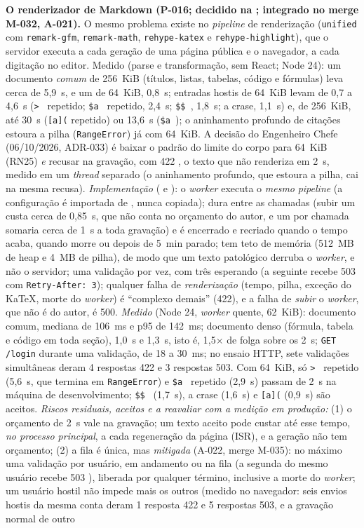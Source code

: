 \textbf{O renderizador de Markdown (P-016; decidido na ; integrado no merge M-032, A-021).} O mesmo problema existe no \emph{pipeline} de renderização (\texttt{unified} com \texttt{remark-gfm}, \texttt{remark-math}, \texttt{rehype-katex} e \texttt{rehype-highlight}), que o servidor executa a cada geração de uma página pública e o navegador, a cada digitação no editor. Medido (parse e transformação, sem React; Node 24): um documento \emph{comum} de 256~KiB (títulos, listas, tabelas, código e fórmulas) leva cerca de 5,9~s, e um de 64~KiB, 0,8~s; entradas hostis de 64~KiB levam de 0,7 a 4,6~s (\texttt{> } repetido; \texttt{\$a } repetido, 2,4~s; \texttt{\$\$ }, 1,8~s; a crase, 1,1~s) e, de 256~KiB, até 30~s (\texttt{[a](} repetido) ou 13,6~s (\texttt{\$a }); o aninhamento profundo de citações estoura a pilha (\texttt{RangeError}) já com 64~KiB. A decisão do Engenheiro Chefe (06/10/2026, ADR-033) é baixar o padrão do limite do corpo para 64~KiB (RN25) \emph{e} recusar na gravação, com 422 , o texto que não renderiza em 2~s, medido em um \emph{thread} separado (o aninhamento profundo, que estoura a pilha, cai na mesma recusa). \emph{Implementação} ( e ): o \emph{worker} executa o \emph{mesmo} \emph{pipeline} (a configuração é importada de , nunca copiada); dura entre as chamadas (subir um custa cerca de 0,85~s, que não conta no orçamento do autor, e um por chamada somaria cerca de 1~s a toda gravação) e é encerrado e recriado quando o tempo acaba, quando morre ou depois de 5~min parado; tem teto de memória (512~MB de heap e 4~MB de pilha), de modo que um texto patológico derruba o \emph{worker}, e não o servidor; uma validação por vez, com três esperando (a seguinte recebe 503  com \texttt{Retry-After: 3}); qualquer falha de \emph{renderização} (tempo, pilha, exceção do KaTeX, morte do \emph{worker}) é ``complexo demais'' (422), e a falha de \emph{subir} o \emph{worker}, que não é do autor, é 500. \emph{Medido} (Node 24, \emph{worker} quente, 62~KiB): documento comum, mediana de 106~ms e p95 de 142~ms; documento denso (fórmula, tabela e código em toda seção), 1,0~s e 1,3~s, isto é, 1,5$\times$ de folga sobre os 2~s; \texttt{GET /login} durante uma validação, de 18 a 30~ms; no ensaio HTTP, sete validações simultâneas deram 4 respostas 422 e 3 respostas 503. Com 64~KiB, só \texttt{> } repetido (5,6~s, que termina em \texttt{RangeError}) e \texttt{\$a } repetido (2,9~s) passam de 2~s na máquina de desenvolvimento; \texttt{\$\$ } (1,7~s), a crase (1,6~s) e \texttt{[a](} (0,9~s) são aceitos. \emph{Riscos residuais, aceitos e a reavaliar com a medição em produção:} (1) o orçamento de 2~s vale na gravação; um texto aceito pode custar até esse tempo, \emph{no processo principal}, a cada regeneração da página (ISR), e a geração não tem orçamento; (2) a fila é única, mas \emph{mitigada} (A-022, merge M-035): no máximo uma validação por usuário, em andamento ou na fila (a segunda do mesmo usuário recebe 503 ), liberada por qualquer término, inclusive a morte do \emph{worker}; um usuário hostil não impede mais os outros (medido no navegador: seis envios hostis da mesma conta deram 1 resposta 422 e 5 respostas 503, e a gravação normal de outro 